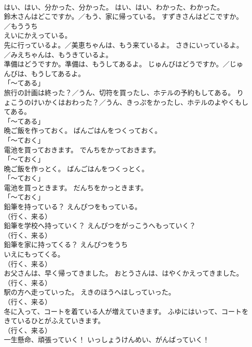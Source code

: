 \documentclass[8pt]{extreport}
\begin{document}
\begin{CJK}{UTF8}{min}
\\	はい、はい、分かった、分かった。	はい、はい、わかった、わかった。	
\\	鈴木さんはどこですか。／もう、家に帰っている。	すずきさんはどこですか。／もう{うち
\\	えい}にかえっている。	
\\	先に行っているよ。／美恵ちゃんは、もう来ているよ。	さきにいっているよ。／みえちゃんは、もうきているよ。	
\\	準備はどうですか。準備は、もうしてあるよ。	じゅんびはどうですか。／じゅんびは、もうしてあるよ。	
\\	「～てある」 
\\	旅行の計画は終った？／うん、切符を買ったし、ホテルの予約もしてある。	りょこうのけいかくはおわった？／うん、きっぷをかったし、ホテルのよやくもしてある。	
\\	「～てある」 
\\	晩ご飯を作っておく。	ばんごはんをつくっておく。	
\\	「～ておく」 
\\	電池を買っておきます。	でんちをかっておきます。	
\\	「～ておく」 
\\	晩ご飯を作っとく。	ばんごはんをつくっとく。	
\\	「～ておく」 
\\	電池を買っときます。	だんちをかっときます。	
\\	「～ておく」 
\\	鉛筆を持っている？	えんぴつをもっている。	
\\	（行く、来る） 
\\	鉛筆を学校へ持っていく？	えんぴつをがっこうへもっていく？	
\\	（行く、来る） 
\\	鉛筆を家に持ってくる？	えんぴつを{うち
\\	いえ}にもってくる。	
\\	（行く、来る） 
\\	お父さんは、早く帰ってきました。	おとうさんは、はやくかえってきました。	
\\	（行く、来る） 
\\	駅の方へ走っていった。	えきのほうへはしっていった。	
\\	（行く、来る） 
\\	冬に入って、コートを着ている人が増えていきます。	ふゆにはいって、コートをきているひとがふえていきます。	
\\	（行く、来る） 
\\	一生懸命、頑張っていく！	いっしょうけんめい、がんばっていく！	

\end{CJK}
\end{document}

